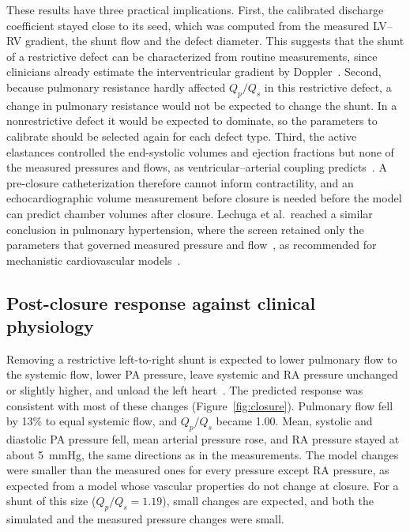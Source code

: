 These results have three practical implications. First, the calibrated discharge coefficient stayed close to its seed, which was computed from the measured LV--RV gradient, the shunt flow and the defect diameter. This suggests that the shunt of a restrictive defect can be characterized from routine measurements, since clinicians already estimate the interventricular gradient by Doppler~\cite{Uppu2022}. Second, because pulmonary resistance hardly affected $Q_p/Q_s$ in this restrictive defect, a change in pulmonary resistance would not be expected to change the shunt. In a nonrestrictive defect it would be expected to dominate, so the parameters to calibrate should be selected again for each defect type. Third, the active elastances controlled the end-systolic volumes and ejection fractions but none of the measured pressures and flows, as ventricular--arterial coupling predicts~\cite{Vriz2021}. A pre-closure catheterization therefore cannot inform contractility, and an echocardiographic volume measurement before closure is needed before the model can predict chamber volumes after closure. Lechuga et al.\ reached a similar conclusion in pulmonary hypertension, where the screen retained only the parameters that governed measured pressure and flow~\cite{Lechuga2026}, as recommended for mechanistic cardiovascular models~\cite{Colebank2024Guidelines}.

\subsection{Post-closure response against clinical physiology}
\label{sec:disc_closure}
Removing a restrictive left-to-right shunt is expected to lower pulmonary flow to the systemic flow, lower PA pressure, leave systemic and RA pressure unchanged or slightly higher, and unload the left heart~\cite{Rao2024,Yuan2025}. The predicted response was consistent with most of these changes (Figure~\ref{fig:closure}). Pulmonary flow fell by 13\% to equal systemic flow, and $Q_p/Q_s$ became 1.00. Mean, systolic and diastolic PA pressure fell, mean arterial pressure rose, and RA pressure stayed at about 5~mmHg, the same directions as in the measurements. The model changes were smaller than the measured ones for every pressure except RA pressure, as expected from a model whose vascular properties do not change at closure. For a shunt of this size ($Q_p/Q_s = 1.19$), small changes are expected, and both the simulated and the measured pressure changes were small.

